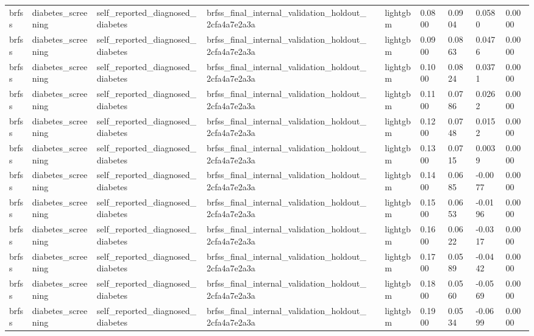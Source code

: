 \begin{tabular}{llllllllll}
brfss & diabetes\_screening & self\_reported\_diagnosed\_diabetes & brfss\_final\_internal\_validation\_holdout\_2cfa4a7e2a3a &  & lightgbm & 0.0800 & 0.0904 & 0.0580 & 0.0000 \\
brfss & diabetes\_screening & self\_reported\_diagnosed\_diabetes & brfss\_final\_internal\_validation\_holdout\_2cfa4a7e2a3a &  & lightgbm & 0.0900 & 0.0863 & 0.0476 & 0.0000 \\
brfss & diabetes\_screening & self\_reported\_diagnosed\_diabetes & brfss\_final\_internal\_validation\_holdout\_2cfa4a7e2a3a &  & lightgbm & 0.1000 & 0.0824 & 0.0371 & 0.0000 \\
brfss & diabetes\_screening & self\_reported\_diagnosed\_diabetes & brfss\_final\_internal\_validation\_holdout\_2cfa4a7e2a3a &  & lightgbm & 0.1100 & 0.0786 & 0.0262 & 0.0000 \\
brfss & diabetes\_screening & self\_reported\_diagnosed\_diabetes & brfss\_final\_internal\_validation\_holdout\_2cfa4a7e2a3a &  & lightgbm & 0.1200 & 0.0748 & 0.0152 & 0.0000 \\
brfss & diabetes\_screening & self\_reported\_diagnosed\_diabetes & brfss\_final\_internal\_validation\_holdout\_2cfa4a7e2a3a &  & lightgbm & 0.1300 & 0.0715 & 0.0039 & 0.0000 \\
brfss & diabetes\_screening & self\_reported\_diagnosed\_diabetes & brfss\_final\_internal\_validation\_holdout\_2cfa4a7e2a3a &  & lightgbm & 0.1400 & 0.0685 & -0.0077 & 0.0000 \\
brfss & diabetes\_screening & self\_reported\_diagnosed\_diabetes & brfss\_final\_internal\_validation\_holdout\_2cfa4a7e2a3a &  & lightgbm & 0.1500 & 0.0653 & -0.0196 & 0.0000 \\
brfss & diabetes\_screening & self\_reported\_diagnosed\_diabetes & brfss\_final\_internal\_validation\_holdout\_2cfa4a7e2a3a &  & lightgbm & 0.1600 & 0.0622 & -0.0317 & 0.0000 \\
brfss & diabetes\_screening & self\_reported\_diagnosed\_diabetes & brfss\_final\_internal\_validation\_holdout\_2cfa4a7e2a3a &  & lightgbm & 0.1700 & 0.0589 & -0.0442 & 0.0000 \\
brfss & diabetes\_screening & self\_reported\_diagnosed\_diabetes & brfss\_final\_internal\_validation\_holdout\_2cfa4a7e2a3a &  & lightgbm & 0.1800 & 0.0560 & -0.0569 & 0.0000 \\
brfss & diabetes\_screening & self\_reported\_diagnosed\_diabetes & brfss\_final\_internal\_validation\_holdout\_2cfa4a7e2a3a &  & lightgbm & 0.1900 & 0.0534 & -0.0699 & 0.0000 \\

\end{tabular}
